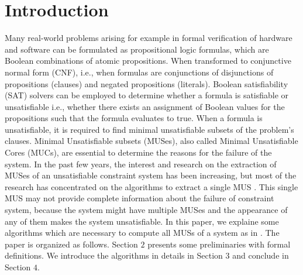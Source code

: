 \section{Introduction}
\label{sec:introduction}
Many real-world problems arising for example in formal verification of hardware and software can be formulated as propositional logic formulas, which are Boolean combinations of atomic propositions. When transformed to conjunctive normal form (CNF), i.e., when formulas are conjunctions of disjunctions of propositions (clauses) and negated propositions (literals). Boolean satisfiability (SAT) solvers can be employed to determine whether a formula is satisfiable or unsatisfiable i.e., whether there exists an assignment of Boolean values for the propositions such that the formula evaluates to true. When a formula is unsatisfiable, it is required to find minimal unsatisfiable subsets of the problem's clauses. Minimal Unsatisfiable subsets (MUSes), also called Minimal Unsatisfiable Cores (MUCs), are essential to determine the reasons for the failure of the system. In the past few years, the interest and research on the extraction of MUSes of an unsatisfiable constraint system has been increasing, but most of the research has concentrated on the algorithms to extract a single MUS \cite{karem}. This single MUS may not provide complete information about the failure of constraint system, because the system might have multiple MUSes and the appearance of any of them makes the system unsatisfiable.\newline
In this paper, we explaine some algorithms which are necessary to compute all MUSs of a system as in \cite{karem}. The paper is organized as follows. Section $2$ presents some preliminaries with formal definitions. We introduce the algorithms in details in Section $3$ and conclude in Section $4$.